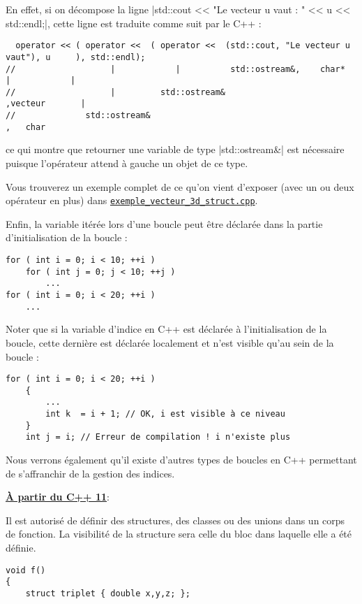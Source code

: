 \begin{itemize}
En effet, si on décompose la ligne |std::cout << "Le vecteur u vaut : " << u << std::endl;|, cette ligne est traduite
comme suit par le C++ :
\begin{lstlisting}
  operator << ( operator <<  ( operator <<  (std::cout, "Le vecteur u vaut"), u     ), std::endl);
//                   |            |          std::ostream&,    char*          |            |
//                   |         std::ostream&                                ,vecteur       |
//              std::ostream&                                                        ,   char
\end{lstlisting}

ce qui montre que retourner une variable de type |std::ostream&| est nécessaire puisque l'opérateur attend à gauche un objet de ce type.

Vous trouverez un exemple complet de ce qu'on vient d'exposer (avec un ou deux opérateur en plus) dans 
\href{run:./Exemples/exemple_vecteur_3d_struct.cpp}{\texttt{exemple\_vecteur\_3d\_struct.cpp}}.


Enfin, la variable itérée lors d'une boucle peut être déclarée dans la partie d'initialisation de la boucle :
\begin{lstlisting}[caption=Initialisation d'une boucle]
for ( int i = 0; i < 10; ++i )
    for ( int j = 0; j < 10; ++j )
        ...
for ( int i = 0; i < 20; ++i )
    ...
\end{lstlisting}

Noter que si la variable d'indice en C++ est déclarée à l'initialisation de la boucle, cette dernière est déclarée localement et n'est visible qu'au sein de la boucle :

\begin{lstlisting}[caption=localité de l'indice de boucle en C++]
    for ( int i = 0; i < 20; ++i )
    {
        ...
        int k  = i + 1; // OK, i est visible à ce niveau
    }
    int j = i; // Erreur de compilation ! i n'existe plus
\end{lstlisting}

Nous verrons également qu'il existe d'autres types de boucles en C++ permettant de s'affranchir de la gestion des indices.

\underline{\textbf{À partir du C++ 11}}:

Il est autorisé de définir des structures, des classes ou des unions dans un corps de fonction. La visibilité de la structure sera celle du bloc dans laquelle elle a été définie.

\begin{lstlisting}[caption=déclaration d'une structure au sein d'une fonction (C++ 11 ou supérieur)]
void f()
{
    struct triplet { double x,y,z; };


\end{lstlisting}
\end{itemize}
